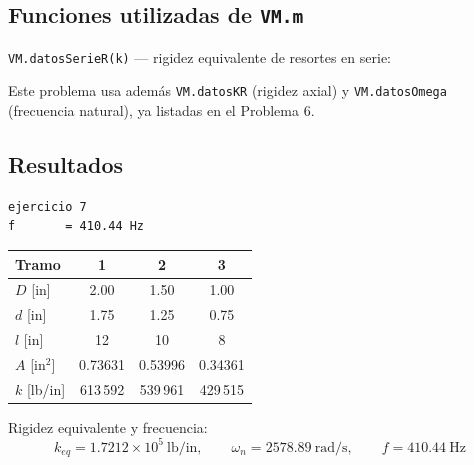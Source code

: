 \documentclass[12pt,letterpaper]{article}
\begin{document}
\subsection{Funciones utilizadas de \texttt{VM.m}}

\noindent\texttt{VM.datosSerieR(k)} --- rigidez equivalente de resortes en serie:


\noindent Este problema usa además \texttt{VM.datosKR} (rigidez axial) y
\texttt{VM.datosOmega} (frecuencia natural), ya listadas en el Problema 6.

\subsection{Resultados}
\begin{lstlisting}[style=consola]
ejercicio 7
f       = 410.44 Hz
\end{lstlisting}

\begin{center}
\begin{tabular}{lccc}
\hline
\textbf{Tramo} & \textbf{1} & \textbf{2} & \textbf{3} \\
\hline
$D$ [in]            & 2.00     & 1.50     & 1.00     \\
$d$ [in]            & 1.75     & 1.25     & 0.75     \\
$l$ [in]            & 12       & 10       & 8        \\
$A$ [in$^2$]        & 0.73631  & 0.53996  & 0.34361  \\
$k$ [lb/in]         & 613\,592 & 539\,961 & 429\,515 \\
\hline
\end{tabular}
\end{center}

\noindent Rigidez equivalente y frecuencia:
\[
k_{eq} = 1.7212\times10^{5}\ \text{lb/in}, \qquad
\omega_n = 2578.89\ \text{rad/s}, \qquad
f = 410.44\ \text{Hz}
\]
\end{document}
